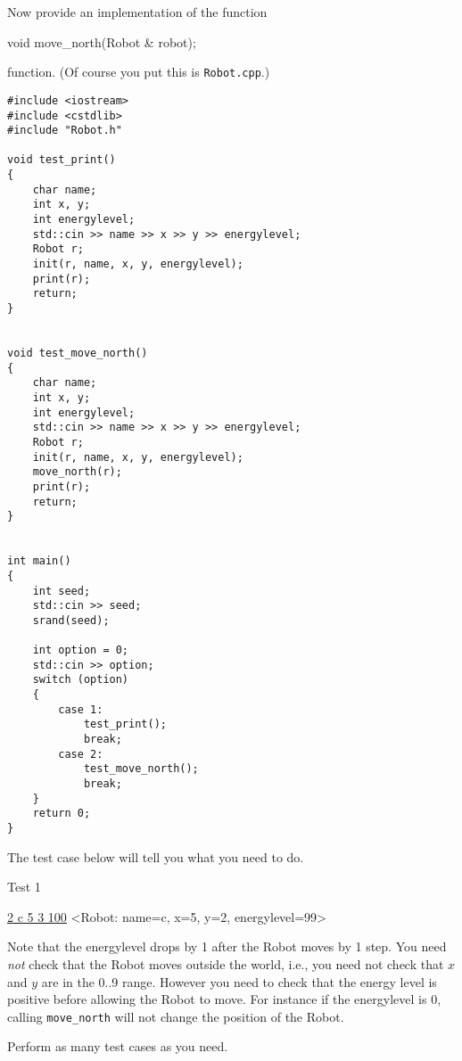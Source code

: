 Now provide an implementation of the function
{\small
\begin{console}
void move_north(Robot & robot);
\end{console}
}
function.
(Of course you put this is \verb!Robot.cpp!.)

{\small
\begin{Verbatim}[frame=single]
#include <iostream>
#include <cstdlib>
#include "Robot.h"

void test_print()
{
    char name;
    int x, y;
    int energylevel;
    std::cin >> name >> x >> y >> energylevel;
    Robot r;
    init(r, name, x, y, energylevel);
    print(r);
    return;
}


void test_move_north()
{
    char name;
    int x, y;
    int energylevel;
    std::cin >> name >> x >> y >> energylevel;
    Robot r;
    init(r, name, x, y, energylevel);
    move_north(r);
    print(r);
    return;
}


int main()
{
    int seed;
    std::cin >> seed;
    srand(seed);
    
    int option = 0;
    std::cin >> option;
    switch (option)
    {
        case 1:
            test_print();
            break;         
        case 2:
            test_move_north();
            break;
    }
    return 0;
}      
\end{Verbatim}
}

The test case below will tell you what you need to do.

Test 1
\begin{console}[commandchars=\\\{\}]
\underline{2 c 5 3 100}
<Robot: name=c, x=5, y=2, energylevel=99>
\end{console}
Note that the energylevel drops by 1 after the Robot moves by 1 step.
You need \textit{not} check that the Robot moves outside the world, i.e.,
you need not check that $x$ and $y$ are in the 0..9 range.
However you need to check that the energy level is positive
before allowing the Robot to move.
For instance if the energylevel is 0, calling \verb!move_north!
will not change the position of the Robot.

Perform as many test cases as you need.
